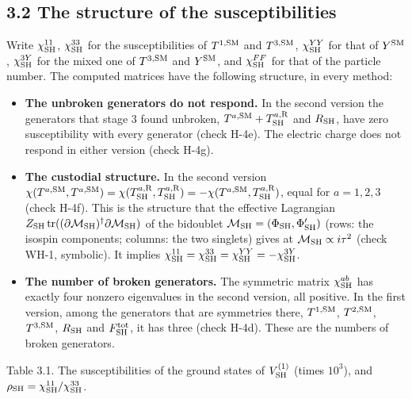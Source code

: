 \documentclass[
  10pt,
]{article}
\providecommand{\tightlist}{%
  \setlength{\itemsep}{0pt}\setlength{\parskip}{0pt}}
\begin{document}
\hypertarget{the-structure-of-the-susceptibilities}{%
\subsection{3.2 The structure of the
susceptibilities}\label{the-structure-of-the-susceptibilities}}

Write \(\chi^{11}_{\rm SH}\), \(\chi^{33}_{\rm SH}\) for the
susceptibilities of \(T^{1,{\rm SM}}\) and \(T^{3,{\rm SM}}\),
\(\chi^{YY}_{\rm SH}\) for that of \(Y^{\rm SM}\),
\(\chi^{3Y}_{\rm SH}\) for the mixed one of \(T^{3,{\rm SM}}\) and
\(Y^{\rm SM}\), and \(\chi^{FF}_{\rm SH}\) for that of the particle
number. The computed matrices have the following structure, in every
method:

\begin{itemize}
\tightlist
\item
  \textbf{The unbroken generators do not respond.} In the second version
  the generators that stage 3 found unbroken,
  \(T^{a,{\rm SM}}+T^{a,{\rm R}}_{\rm SH}\) and \(R_{\rm SH}\), have
  zero susceptibility with every generator (check H-4e). The electric
  charge does not respond in either version (check H-4g).
\item
  \textbf{The custodial structure.} In the second version
  \(\chi(T^{a,{\rm SM}},T^{a,{\rm SM}})=\chi(T^{a,{\rm R}}_{\rm SH},T^{a,{\rm R}}_{\rm SH})=-\chi(T^{a,{\rm SM}},T^{a,{\rm R}}_{\rm SH})\),
  equal for \(a=1,2,3\) (check H-4f). This is the structure that the
  effective Lagrangian
  \(Z_{\rm SH}\,\mathrm{tr}((\partial\mathcal M_{\rm SH})^\dagger\partial\mathcal M_{\rm SH})\)
  of the bidoublet
  \(\mathcal M_{\rm SH}=(\Phi_{\rm SH},\Phi'_{\rm SH})\) (rows: the
  isospin components; columns: the two singlets) gives at
  \(\mathcal M_{\rm SH}\propto i\tau^2\) (check WH-1, symbolic). It
  implies
  \(\chi^{11}_{\rm SH}=\chi^{33}_{\rm SH}=\chi^{YY}_{\rm SH}=-\chi^{3Y}_{\rm SH}\).
\item
  \textbf{The number of broken generators.} The symmetric matrix
  \(\chi^{ab}_{\rm SH}\) has exactly four nonzero eigenvalues in the
  second version, all positive. In the first version, among the
  generators that are symmetries there, \(T^{1,{\rm SM}}\),
  \(T^{2,{\rm SM}}\), \(T^{3,{\rm SM}}\), \(R_{\rm SH}\) and
  \(F^{\rm tot}_{\rm SH}\), it has three (check H-4d). These are the
  numbers of broken generators.
\end{itemize}

Table 3.1. The susceptibilities of the ground states of
\(V^{(1)}_{\rm SH}\) (times \(10^3\)), and
\(\rho_{\rm SH}=\chi^{11}_{\rm SH}/\chi^{33}_{\rm SH}\).
\end{document}
